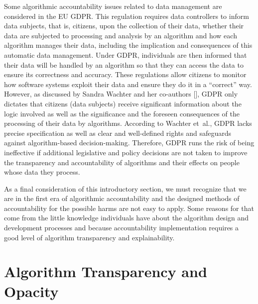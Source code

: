 Some algorithmic accountability issues related to data management are considered in the EU GDPR. This regulation requires data controllers to inform data subjects, that is, citizens, upon the collection of their data, whether their data are subjected to processing and analysis by an algorithm and how each algorithm manages their data, including the implication and consequences of this automatic data management. Under GDPR, individuals are then informed that their data will be handled by an algorithm so that they can access the data to ensure its correctness and accuracy. These regulations allow citizens to monitor how software systems exploit their data and ensure they do it in a ``correct'' way. However, as discussed by Sandra Wachter and her co-authors [\citealt{chap:10:Wachteretal:2017}], GDPR only dictates that citizens (data subjects) receive significant information about the logic involved as well as the significance and the foreseen consequences of the processing of their data by algorithms. According to Wachter et~al., GDPR lacks precise specification as well as clear and well-defined rights and safeguards against algorithm-based decision-making. Therefore, GDPR runs the risk of being ineffective if additional legislative and policy decisions are not taken to improve the transparency and accountability of algorithms and their effects on people whose data they process.

As a final consideration of this introductory section, we must recognize that we are in the first era of algorithmic accountability and the designed methods of accountability for the possible harms are not easy to apply. Some reasons for that come from the little knowledge individuals have about the algorithm design and development processes and because accountability implementation requires a good level of algorithm transparency and explainability.

\section{\label{sec:10.2}Algorithm Transparency and Opacity}

